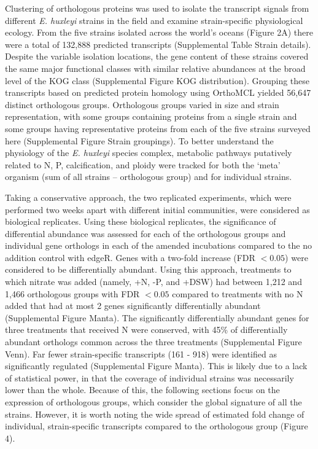 Clustering of orthologous proteins was used to isolate the transcript signals from different \textit{E. huxleyi} strains in the field and examine strain-specific physiological ecology. From the five strains isolated across the world's oceans (Figure 2A) there were a total of 132,888 predicted transcripts (Supplemental Table Strain details). Despite the variable isolation locations, the gene content of these strains covered the same major functional classes with similar relative abundances at the broad level of the KOG class (Supplemental Figure KOG distribution). Grouping these transcripts based on predicted protein homology using OrthoMCL \citep{Li2003} yielded 56,647 distinct orthologous groups. Orthologous groups varied in size and strain representation, with some groups containing proteins from a single strain and some groups having representative proteins from each of the five strains surveyed here (Supplemental Figure Strain groupings). To better understand the physiology of the \textit{E. huxleyi} species complex, metabolic pathways putatively related to N, P, calcification, and ploidy were tracked for both the `meta' organism (sum of all strains -- orthologous group) and for individual strains. \par

Taking a conservative approach, the two replicated experiments, which were performed two weeks apart with different initial communities, were considered as biological replicates. Using these biological replicates, the significance of differential abundance was assessed for each of the orthologous groups and individual gene orthologs in each of the amended incubations compared to the no addition control with edgeR. Genes with a two-fold increase (FDR $< 0.05$) were considered to be differentially abundant. Using this approach, treatments to which nitrate was added (namely, +N, -P, and +DSW) had between 1,212 and 1,466 orthologous groups with FDR $< 0.05$ compared to treatments with no N added that had at most 2 genes significantly differentially abundant (Supplemental Figure Manta). The significantly differentially abundant genes for three treatments that received N were conserved, with 45\% of differentially abundant orthologs common across the three treatments (Supplemental Figure Venn). Far fewer strain-specific transcripts (161 - 918) were identified as significantly regulated (Supplemental Figure Manta). This is likely due to a lack of statistical power, in that the coverage of individual strains was necessarily lower than the whole. Because of this, the following sections focus on the expression of orthologous groups, which consider the global signature of all the strains. However, it is worth noting the wide spread of estimated fold change of individual, strain-specific transcripts compared to the orthologous group (Figure 4). \par


